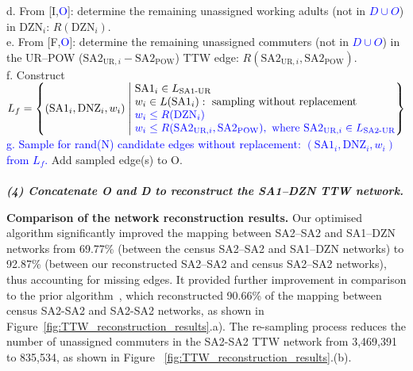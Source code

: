 \documentclass{article}
\begin{document}
\begin{appendices}
\begin{algorithm}[ht]
\begin{algorithmic}
\hspace*{1.5cm} d. From [I,\textcolor{blue}{O}]: determine the remaining unassigned working adults (not in \textcolor{blue}{$D \cup O$}) in $\text{DZN}_i$: $R(\text{DZN}_i)$.\\

\hspace*{1.48cm} e. From [F,\textcolor{blue}{O}]: determine the remaining unassigned commuters (not in \textcolor{blue}{$D \cup O$}) in the UR--POW ($\text{SA2}_{\text{UR},i}-\text{SA2}_\text{POW}$) TTW edge: $R(\text{SA2}_{\text{UR},i}, \text{SA2}_\text{POW})$.\\

\hspace*{1.5cm} f. Construct $L_{f} = \left\{(\text{SA1}_i, \text{DNZ}_i, w_i) \;\middle\vert\;
   \begin{array}{@{}l@{}}
        \text{SA1}_i \in L_{\text{SA1-UR}}\\ 
        w_i \in L(\text{SA1}_i): \text{ sampling without replacement}\\
        \textcolor{blue}{w_i \leq R(\text{DZN}_i)}\\
        \textcolor{blue}{w_i \leq R(\text{SA2}_{\text{UR},i}, \text{SA2}_\text{POW}), \text{ where } \text{SA2}_{\text{UR},i} \in L_{\text{SA2-UR}}}\\
   \end{array}
\right\}$\\

\vspace*{0.1cm}\hspace*{1.5cm} \textcolor{blue}{g. Sample for rand(N) candidate edges without replacement: $(\text{SA1}_i, \text{DNZ}_i, w_i)$ from $L_{f}$.} Add sampled edge(s) to O.\\\\

\hspace*{0cm} \textit{\textbf{(4) Concatenate O and D to reconstruct the SA1--DZN TTW network.}}\\
\end{algorithmic}
\end{algorithm}


\textbf{Comparison of the network reconstruction results.} 
Our optimised algorithm significantly improved the mapping between SA2--SA2 and SA1--DZN networks  from 69.77\% (between the census SA2--SA2 and SA1--DZN networks)  to 92.87\% (between our reconstructed SA2--SA2 and census SA2--SA2 networks), thus accounting for missing edges. It provided further improvement in comparison to the prior algorithm~\cite{fair_creating_2019}, which  reconstructed 90.66\% of the mapping between census SA2-SA2 and  SA2-SA2 networks, as shown in Figure~\ref{fig:TTW_reconstruction_results}.a). The re-sampling process reduces the number of unassigned commuters in the SA2-SA2 TTW network from 3,469,391 to 835,534, as shown in Figure~ \ref{fig:TTW_reconstruction_results}.(b). 


\end{appendices}
\end{document}
